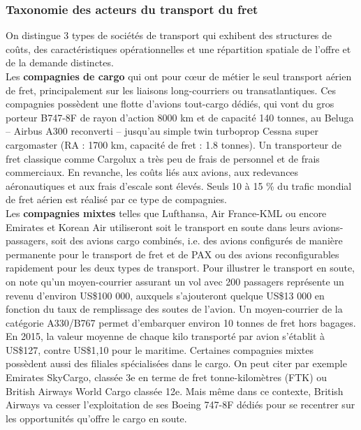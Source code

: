 \subsubsection{Taxonomie des acteurs du transport du fret}
\label{taxonomie}
On distingue 3 types de sociétés de transport qui exhibent des structures de coûts, des caractéristiques opérationnelles et une répartition spatiale de l'offre et de la demande distinctes.\\


Les \textbf{compagnies de cargo} qui ont pour cœur de métier le seul transport aérien de fret, principalement sur les liaisons long-courriers ou transatlantiques. Ces compagnies possèdent une flotte d'avions tout-cargo dédiés, qui vont du gros porteur B747-8F de rayon d'action 8000 km et de capacité 140 tonnes, au Beluga – Airbus A300 reconverti – jusqu'au simple twin turboprop Cessna super cargomaster (RA : 1700 km, capacité de fret : 1.8 tonnes). Un transporteur de fret classique comme Cargolux a très peu de frais de personnel et de frais commerciaux. En revanche, les coûts liés aux avions, aux redevances aéronautiques et aux frais d’escale sont élevés. Seuls 10 à 15 \% du trafic mondial de fret aérien est réalisé par ce type de compagnies. \cite{popescu}\\
	
Les \textbf{compagnies mixtes} telles que Lufthansa, Air France-KML ou encore Emirates et Korean Air utiliseront soit le transport en soute dans leurs avions-passagers, soit des avions cargo combinés, i.e. des avions configurés de manière permanente pour le transport de fret et de PAX ou des avions reconfigurables rapidement pour les deux types de transport. Pour illustrer le transport en soute, on note qu'un moyen-courrier assurant un vol avec 200 passagers représente un revenu d’environ US\$100 000, auxquels s’ajouteront quelque US\$13 000 en fonction du taux de remplissage des soutes de l’avion. Un moyen-courrier de la catégorie A330/B767 permet d’embarquer environ 10 tonnes de fret hors bagages. En 2015, la valeur moyenne de chaque kilo transporté par avion s’établit à US\$127, contre US\$1,10 pour le maritime.
Certaines compagnies mixtes possèdent aussi des filiales spécialisées dans le cargo. On peut citer par exemple Emirates SkyCargo, classée 3e en terme de fret tonne-kilomètres (FTK) ou British Airways World Cargo classée 12e. Mais même dans ce contexte, British Airways va cesser l'exploitation de ses Boeing 747-8F dédiés pour se recentrer sur les opportunités qu'offre le cargo en soute. \cite{theEconomist01}\\


